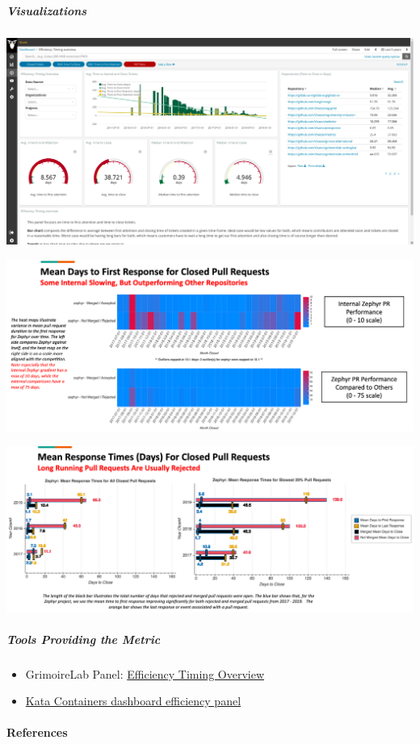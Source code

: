 \hypertarget{visualizations}{%
\subparagraph{Visualizations}\label{visualizations}}

\includegraphics{images/time-to-first-response_efficiency-timing-overview.png}

\includegraphics{images/time-to-first-response_augur-ttc-1.png}

\includegraphics{images/time-to-first-response_augur-ttc-2.png}

\hypertarget{tools-providing-the-metric}{%
\subparagraph{Tools Providing the
Metric}\label{tools-providing-the-metric}}

\begin{itemize}
\tightlist
\item
  GrimoireLab Panel:
  \href{https://chaoss.github.io/grimoirelab-sigils/panels/efficiency-timing-overview/}{Efficiency
  Timing Overview}
\item
  \href{https://katacontainers.biterg.io/app/kibana\#/dashboard/cbbdd920-288c-11e9-b662-975152e57997}{Kata
  Containers dashboard efficiency panel}
\end{itemize}

\hypertarget{references}{%
\paragraph{References}\label{references}}
